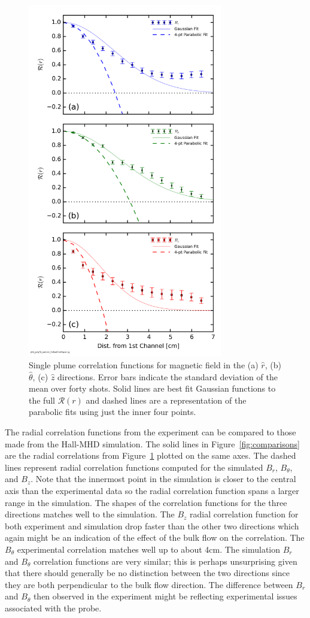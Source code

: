 \documentclass[aps,prl,amsmath,amssymb,reprint,superscriptaddress]{revtex4-1} %
\begin{document}
\begin{figure}[!htbp]
\centerline{
\includegraphics[width=8.5cm]{RadialCorrelation_BrBtBz_1mWb_wdetrend.png}}
\caption{Single plume correlation functions for magnetic field in the (a) $\hat{r}$, (b) $\hat{\theta}$, (c) $\hat{z}$ directions. Error bars indicate the standard deviation of the mean over forty shots. Solid lines are best fit Gaussian functions to the full $\mathcal{R}(r)$ and dashed lines are a representation of the parabolic fits using just the inner four points.}
\label{fig:brbtbz}
\end{figure}

The radial correlation functions from the experiment can be compared to those made from the Hall-MHD simulation. The solid lines in Figure~\ref{fig:comparisons} are the radial correlations from Figure~\ref{fig:brbtbz} plotted on the same axes. The dashed lines represent radial correlation functions computed for the simulated $B_{r}$, $B_{\theta}$, and $B_{z}$. Note that the innermost point in the simulation is closer to the central axis than the experimental data so the radial correlation function spans a larger range in the simulation. The shapes of the correlation functions for the three directions matches well to the simulation. The $B_{z}$ radial correlation function for both experiment and simulation drop faster than the other two directions which again might be an indication of the effect of the bulk flow on the correlation. The $B_{\theta}$ experimental correlation matches well up to about 4cm. The simulation $B_{r}$ and $B_{\theta}$ correlation functions are very similar; this is perhaps unsurprising given that there should generally be no distinction between the two directions since they are both perpendicular to the bulk flow direction. The difference between $B_{r}$ and $B_{\theta}$ then observed in the experiment might be reflecting experimental issues associated with the probe.
\end{document}
